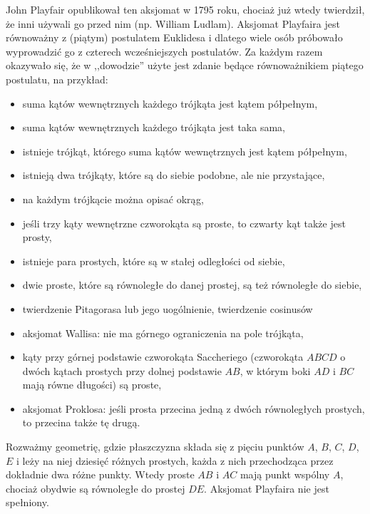 John Playfair opublikował ten aksjomat w 1795 roku, chociaż już wtedy twierdził, że inni używali go przed nim (np. William Ludlam).
%
Aksjomat Playfaira jest równoważny z (piątym) postulatem Euklidesa i dlatego wiele osób próbowało wyprowadzić go z czterech wcześniejszych postulatów.
Za każdym razem okazywało się, że w ,,dowodzie'' użyte jest zdanie będące równoważnikiem piątego postulatu, na przykład:
\begin{itemize}
    \item suma kątów wewnętrznych każdego trójkąta jest kątem półpełnym,
    \item suma kątów wewnętrznych każdego trójkąta jest taka sama,
    \item istnieje trójkąt, którego suma kątów wewnętrznych jest kątem półpełnym,
    \item istnieją dwa trójkąty, które są do siebie podobne, ale nie przystające,
    \item na każdym trójkącie można opisać okrąg,
    \item jeśli trzy kąty wewnętrzne czworokąta są proste, to czwarty kąt także jest prosty,
    \item istnieje para prostych, które są w stałej odległości od siebie,
    \item dwie proste, które są równoległe do danej prostej, są też równoległe do siebie,
    \item twierdzenie Pitagorasa lub jego uogólnienie, twierdzenie cosinusów
    \item aksjomat Wallisa: nie ma górnego ograniczenia na pole trójkąta,
    \item kąty przy górnej podstawie czworokąta Saccheriego (czworokąta $ABCD$ o dwóch kątach prostych przy dolnej podstawie $AB$, w którym boki $AD$ i $BC$ mają równe długości) są proste,
    \item aksjomat Proklosa: jeśli prosta przecina jedną z dwóch równoległych prostych, to przecina także tę drugą.
\end{itemize}


\begin{example}
    Rozważmy geometrię, gdzie płaszczyzna składa się z pięciu punktów $A$, $B$, $C$, $D$, $E$ i leży na niej dziesięć różnych prostych, każda z nich przechodząca przez dokładnie dwa różne punkty.
    Wtedy proste $AB$ i $AC$ mają punkt wspólny $A$, chociaż obydwie są równoległe do prostej $DE$.
    Aksjomat Playfaira nie jest spełniony.
\end{example}

